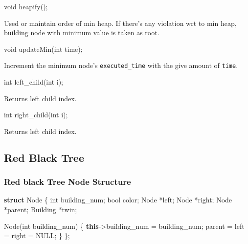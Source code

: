 \documentclass[
]{article}
\newenvironment{Shaded}{}{}
\newcommand{\DataTypeTok}[1]{\textcolor[rgb]{0.56,0.13,0.00}{#1}}
\newcommand{\KeywordTok}[1]{\textcolor[rgb]{0.00,0.44,0.13}{\textbf{#1}}}
\newcommand{\NormalTok}[1]{#1}
\begin{document}
\begin{Shaded}
\begin{Highlighting}[]
\DataTypeTok{void}\NormalTok{ heapify();}
\end{Highlighting}
\end{Shaded}

Used or maintain order of min heap. If there's any violation wrt to min
heap, building node with minimum value is taken as root.

\begin{Shaded}
\begin{Highlighting}[]
\DataTypeTok{void}\NormalTok{ updateMin(}\DataTypeTok{int}\NormalTok{ time);}
\end{Highlighting}
\end{Shaded}

Increment the minimum node's \texttt{executed\_time} with the give
amount of \texttt{time}.

\begin{Shaded}
\begin{Highlighting}[]
\DataTypeTok{int}\NormalTok{ left_child(}\DataTypeTok{int}\NormalTok{ i);}
\end{Highlighting}
\end{Shaded}

Returns left child index.

\begin{Shaded}
\begin{Highlighting}[]
\DataTypeTok{int}\NormalTok{ right_child(}\DataTypeTok{int}\NormalTok{ i);}
\end{Highlighting}
\end{Shaded}

Returns left child index.

\hypertarget{red-black-tree}{%
\subsection{Red Black Tree}\label{red-black-tree}}

\hypertarget{red-black-tree-node-structure}{%
\subsubsection{Red black Tree Node
Structure}\label{red-black-tree-node-structure}}

\begin{Shaded}
\begin{Highlighting}[]
\KeywordTok{struct}\NormalTok{ Node \{}
    \DataTypeTok{int}\NormalTok{ building_num;}
    \DataTypeTok{bool}\NormalTok{ color;}
\NormalTok{    Node *left;}
\NormalTok{    Node *right;}
\NormalTok{    Node *parent;}
\NormalTok{    Building *twin;}

\NormalTok{    Node(}\DataTypeTok{int}\NormalTok{ building_num) \{}
        \KeywordTok{this}\NormalTok{->building_num = building_num;}
\NormalTok{        parent = left = right = NULL;}
\NormalTok{    \}}
\NormalTok{\};}
\end{Highlighting}
\end{Shaded}
\end{document}
